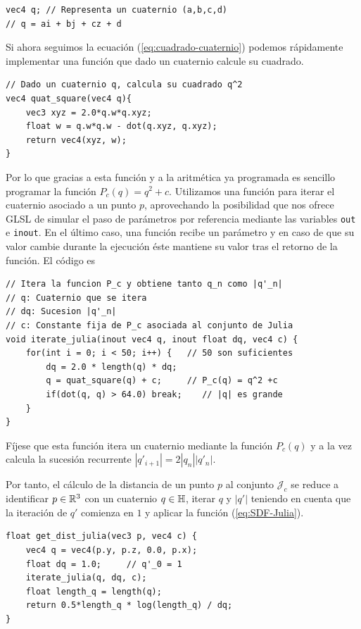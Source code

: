 \begin{lstlisting}
vec4 q; // Representa un cuaternio (a,b,c,d)
// q = ai + bj + cz + d
\end{lstlisting}

Si ahora seguimos la ecuación (\ref{eq:cuadrado-cuaternio}) podemos rápidamente implementar una función que dado un cuaternio calcule su cuadrado.

\begin{lstlisting}
// Dado un cuaternio q, calcula su cuadrado q^2
vec4 quat_square(vec4 q){
    vec3 xyz = 2.0*q.w*q.xyz;
    float w = q.w*q.w - dot(q.xyz, q.xyz);
    return vec4(xyz, w);
}
\end{lstlisting}

Por lo que gracias a esta función y a la aritmética ya programada es sencillo programar la función $P_c(q)=q^2+c$. Utilizamos una función para iterar el cuaternio asociado a un punto $p$, aprovechando la posibilidad que nos ofrece GLSL de simular el paso de parámetros por referencia mediante las variables \verb|out| e \verb|inout|. En el último caso, una función recibe un parámetro y en caso de que su valor cambie durante la ejecución éste mantiene su valor tras el retorno de la función. El código es 
\begin{lstlisting}
// Itera la funcion P_c y obtiene tanto q_n como |q'_n|
// q: Cuaternio que se itera
// dq: Sucesion |q'_n|
// c: Constante fija de P_c asociada al conjunto de Julia
void iterate_julia(inout vec4 q, inout float dq, vec4 c) {
    for(int i = 0; i < 50; i++) {   // 50 son suficientes
        dq = 2.0 * length(q) * dq;
        q = quat_square(q) + c;     // P_c(q) = q^2 +c
        if(dot(q, q) > 64.0) break;    // |q| es grande
    }
}
\end{lstlisting}

Fíjese que esta función itera un cuaternio mediante la función $P_c(q)$ y a la vez calcula la sucesión recurrente $|q'_{i+1}|=2|q_n||q'_n|$. 

Por tanto, el cálculo de la distancia de un punto $p$ al conjunto $\mathcal{J}_c$ se reduce a identificar $p\in\mathbb{R}^3$ con un cuaternio $q\in\mathbb{H}$, iterar $q$ y $|q'|$ teniendo en cuenta que la iteración de $q'$ comienza en $1$ y aplicar la función (\ref{eq:SDF-Julia}).

\begin{lstlisting}
float get_dist_julia(vec3 p, vec4 c) { 
    vec4 q = vec4(p.y, p.z, 0.0, p.x);
    float dq = 1.0;     // q'_0 = 1
    iterate_julia(q, dq, c);
    float length_q = length(q);
    return 0.5*length_q * log(length_q) / dq;
}
\end{lstlisting}

